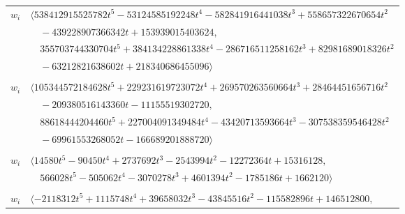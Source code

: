 \documentclass[11pt]{article}
\begin{document}
\begin{longtable}{@{}ll@{}}
$w_i$ & $\langle 538412915525782t^{5}-53124585192248t^{4}-582841916441038t^{3}+558657322670654t^{2}$\\
 & $\quad -439228907366342t+153939015403624,$\\
 & $\quad 355703744330704t^{5}+384134228861338t^{4}-286716511258162t^{3}+82981689018326t^{2}$\\
 & $\quad -63212821638602t+218340686455096\rangle$\\
\addlinespace[2pt]
\multicolumn{2}{@{}p{0.97\textwidth}@{}}{$i=51$, $D_i=893871739$, $\rho_{ij}$: $4{:}2, \allowbreak 6{:}1, \allowbreak 9{:}2, \allowbreak 16{:}1, \allowbreak 18{:}2, \allowbreak 22{:}2, \allowbreak 23{:}1, \allowbreak 24{:}2, \allowbreak 32{:}1, \allowbreak 34{:}2, \allowbreak 48{:}1, \allowbreak 52{:}2, \allowbreak 57{:}1, \allowbreak 62{:}1, \allowbreak 66{:}1, \allowbreak 70{:}1, \allowbreak 72{:}2, \allowbreak 95{:}2, \allowbreak 97{:}1$}\\
$w_i$ & $\langle 105344572184628t^{5}+229231619723072t^{4}+269570263560664t^{3}+28464451656716t^{2}$\\
 & $\quad -209380516143360t-11155519302720,$\\
 & $\quad 88618444204460t^{5}+227004091349484t^{4}-43420713593664t^{3}-307538359546428t^{2}$\\
 & $\quad -69961553268052t-166689201888720\rangle$\\
\addlinespace[2pt]
\multicolumn{2}{@{}p{0.97\textwidth}@{}}{$i=52$, $D_i=27$, $\rho_{ij}$: $3{:}1, \allowbreak 5{:}1, \allowbreak 17{:}2, \allowbreak 23{:}1, \allowbreak 31{:}1, \allowbreak 41{:}1, \allowbreak 51{:}1, \allowbreak 53{:}2, \allowbreak 62{:}2, \allowbreak 65{:}1, \allowbreak 67{:}2, \allowbreak 68{:}1, \allowbreak 75{:}2, \allowbreak 88{:}1, \allowbreak 93{:}2, \allowbreak 97{:}2$}\\
$w_i$ & $\langle 14580t^{5}-90450t^{4}+2737692t^{3}-2543994t^{2}-12272364t+15316128,$\\
 & $\quad 566028t^{5}-505062t^{4}-3070278t^{3}+4601394t^{2}-1785186t+1662120\rangle$\\
\addlinespace[2pt]
\multicolumn{2}{@{}p{0.97\textwidth}@{}}{$i=53$, $D_i=27$, $\rho_{ij}$: $3{:}2, \allowbreak 5{:}2, \allowbreak 6{:}2, \allowbreak 8{:}1, \allowbreak 9{:}2, \allowbreak 16{:}1, \allowbreak 21{:}1, \allowbreak 30{:}2, \allowbreak 42{:}2, \allowbreak 46{:}2, \allowbreak 50{:}2, \allowbreak 52{:}1, \allowbreak 57{:}1, \allowbreak 64{:}1, \allowbreak 77{:}2, \allowbreak 96{:}1$}\\
$w_i$ & $\langle -2118312t^{5}+1115748t^{4}+39658032t^{3}-43845516t^{2}-115582896t+146512800,$\\

\end{longtable}
\end{document}
